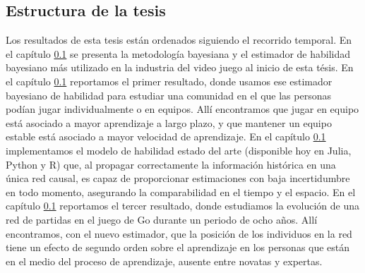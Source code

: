 \documentclass[a4paper,11pt]{book}
\theoremstyle{definition}
\begin{document}
\subsection{Estructura de la tesis}

Los resultados de esta tesis están ordenados siguiendo el recorrido temporal.
%
En el capítulo \ref{} se presenta la metodología bayesiana y el estimador de habilidad bayesiano más utilizado en la industria del video juego al inicio de esta tésis.
%
En el capítulo \ref{} reportamos el primer resultado, donde usamos ese estimador bayesiano de habilidad para estudiar una comunidad en el que las personas podían jugar individualmente o en equipos.
%
Allí encontramos que jugar en equipo está asociado a mayor aprendizaje a largo plazo, y que mantener un equipo estable está asociado a mayor velocidad de aprendizaje.
%
En el capítulo \ref{} implementamos el modelo de habilidad estado del arte (disponible hoy en Julia, Python y R) que, al propagar correctamente la información histórica en una única red causal, es capaz de proporcionar estimaciones con baja incertidumbre en todo momento, asegurando la comparabilidad en el tiempo y el espacio.
%
En el capítulo \ref{} reportamos el tercer resultado, donde estudiamos la evolución de una red de partidas en el juego de Go durante un periodo de ocho años.
%
Allí encontramos, con el nuevo estimador, que la posición de los individuos en la red tiene un efecto de segundo orden sobre el aprendizaje en los personas que están en el medio del proceso de aprendizaje, ausente entre novatas y expertas.
\end{document}
